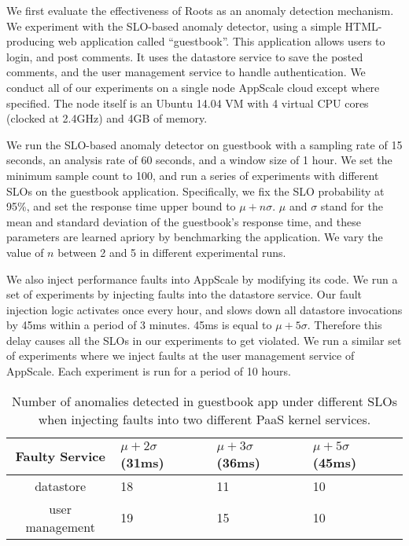 We first evaluate the effectiveness of Roots as an anomaly detection mechanism. We experiment with
the SLO-based anomaly detector, using a simple HTML-producing web application called ``guestbook''.
This application allows users to login, and post comments. It uses the datastore service to save
the posted comments, and the user management service to handle authentication. We conduct all
of our experiments on a single node AppScale cloud except where specified. The node itself is an Ubuntu
14.04 VM with 4 virtual CPU cores (clocked at 2.4GHz) and 4GB of memory.

We run the SLO-based anomaly detector on guestbook with a sampling rate of 15 seconds, an analysis
rate of 60 seconds, and a window size of 1 hour. We set the minimum sample count to 100, and
run a series of experiments with different SLOs on the guestbook application. Specifically, we fix
the SLO probability at 95\%, and set the response time upper bound to $\mu + n\sigma$. 
$\mu$ and $\sigma$ stand for the mean and standard deviation of the
guestbook's response time, and these parameters are learned apriory by benchmarking
the application. We vary the value of $n$ between 2 and 5 in different experimental runs.

We also inject performance faults into AppScale by modifying its code. We run a set of experiments
by injecting faults into the datastore service. Our fault injection logic activates once every hour, and
slows down all datastore invocations by 45ms within a period of 3 minutes. 45ms is equal 
to $\mu + 5\sigma$. Therefore this delay causes all the SLOs in our experiments to get violated. 
We run a similar set of experiments where
we inject faults at the user management service of AppScale. Each experiment is run for a 
period of 10 hours.

\begin{table}
\begin{center}
\begin{tabular}{|c|p{1cm}|p{1cm}|p{1cm}|}
\hline
Faulty Service & $\mu + 2\sigma$ (31ms) & $\mu + 3\sigma$ (36ms) & $\mu + 5\sigma$ (45ms) \\ \hline
datastore & 18 & 11 & 10 \\ \hline
user management & 19 & 15 & 10 \\ \hline
\end{tabular}
\end{center}
\caption{Number of anomalies detected in guestbook app under different SLOs when
injecting faults into two different PaaS kernel services.
\label{tab:anomaly_counts}
}
\end{table}

